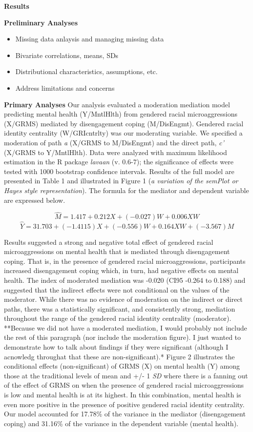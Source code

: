 \documentclass[
  11pt,
]{book}
\providecommand{\tightlist}{%
  \setlength{\itemsep}{0pt}\setlength{\parskip}{0pt}}
\begin{document}
\textbf{Results}

\textbf{Preliminary Analyses}

\begin{itemize}
\tightlist
\item
  Missing data anlaysis and managing missing data
\item
  Bivariate correlations, means, SDs
\item
  Distributional characteristics, assumptions, etc.
\item
  Address limitations and concerns
\end{itemize}

\textbf{Primary Analyses}
Our analysis evaluated a moderation mediation model predicting mental health (Y/MntlHlth) from gendered racial microaggressions (X/GRMS) mediated by disengagement coping (M/DisEngmt). Gendered racial identity centrality (W/GRIcntrlty) was our moderating variable. We specified a moderation of path \emph{a} (X/GRMS to M/DisEngmt) and the direct path, \emph{c'} (X/GRMS to Y/MntlHlth). Data were analyzed with maximum likelihood estimation in the R package \emph{lavaan} (v. 0.6-7); the significance of effects were tested with 1000 bootstrap confidence intervals. Results of the full model are presented in Table 1 and illustrated in Figure 1 (\emph{a variation of the semPlot or Hayes style representation}). The formula for the mediator and dependent variable are expressed below.

\[\hat{M} = 1.417 + 0.212X + (-0.027) W + 0.006XW\]
\[\hat{Y} = 31.703 + (-1.4115)X + (-0.556)W + 0.164XW + (-3.567)M\]

Results suggested a strong and negative total effect of gendered racial microaggressions on mental health that is mediated through disengagement coping. That is, in the presence of gendered racial microaggressions, participants increased disengagement coping which, in turn, had negative effects on mental health. The index of moderated mediation was -0.020 (CI95 -0.264 to 0.188) and suggested that the indirect effects were not conditional on the values of the moderator. While there was no evidence of moderation on the indirect or direct paths, there was a statistically significant, and consistently strong, mediation throughout the range of the gendered racial identity centrality (moderator). **Because we did not have a moderated mediation, I would probably not include the rest of this paragraph (nor include the moderation figure). I just wanted to demonstrate how to talk about findings if they were significant (although I acnowledg throughat that these are non-significant).* Figure 2 illustrates the conditional effects (non-significant) of GRMS (X) on mental health (Y) among those at the traditional levels of mean and +/- 1 \emph{SD} where there is a fanning out of the effect of GRMS on when the presence of gendered racial microaggressions is low and mental health is at its highest. In this combination, mental health is even more positive in the presence of positive gendered racial identity centrality. Our model accounted for 17.78\% of the variance in the mediator (disengagement coping) and 31.16\% of the variance in the dependent variable (mental health).
\end{document}
